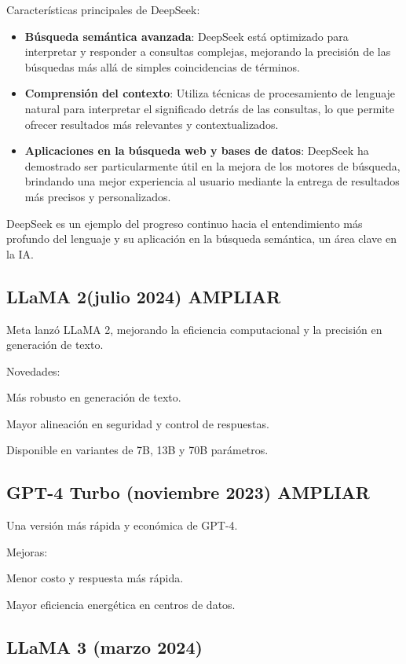 Características principales de DeepSeek:
\begin{itemize}
    \item \textbf{Búsqueda semántica avanzada}: DeepSeek está optimizado para interpretar y responder a consultas complejas, mejorando la precisión de las búsquedas más allá de simples coincidencias de términos.
    \item \textbf{Comprensión del contexto}: Utiliza técnicas de procesamiento de lenguaje natural para interpretar el significado detrás de las consultas, lo que permite ofrecer resultados más relevantes y contextualizados.
    \item \textbf{Aplicaciones en la búsqueda web y bases de datos}: DeepSeek ha demostrado ser particularmente útil en la mejora de los motores de búsqueda, brindando una mejor experiencia al usuario mediante la entrega de resultados más precisos y personalizados.
\end{itemize}

DeepSeek es un ejemplo del progreso continuo hacia el entendimiento más profundo del lenguaje y su aplicación en la búsqueda semántica, un área clave en la IA.


\subsection{LLaMA 2(julio 2024) AMPLIAR}

Meta lanzó LLaMA 2, mejorando la eficiencia computacional y la precisión en generación de texto.

Novedades:

Más robusto en generación de texto.

Mayor alineación en seguridad y control de respuestas.

Disponible en variantes de 7B, 13B y 70B parámetros.


\subsection{GPT-4 Turbo (noviembre 2023) AMPLIAR}

Una versión más rápida y económica de GPT-4.

Mejoras:

Menor costo y respuesta más rápida.

Mayor eficiencia energética en centros de datos.


\subsection{LLaMA 3 (marzo 2024)}

